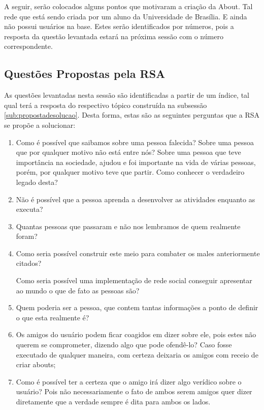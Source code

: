 A seguir, serão colocados alguns pontos que motivaram a criação da About. Tal rede que está sendo criada por um aluno
da Universidade de Brasília.
E ainda não possui usuários na base. Estes serão identificados por
números, pois a resposta da questão levantada estará na próxima sessão com o número correspondente.



\subsection{Questões Propostas pela RSA}
\label{sub:questoesrsa}
As questões levantadas nesta sessão são identificadas a partir de um índice,
tal qual terá a resposta do respectivo tópico
construída na subsessão \ref{sub:propostadesolucao}. Desta forma, estas
são as seguintes perguntas que a RSA se propõe a solucionar:

\begin{enumerate}
    \item Como é possível que saibamos sobre uma pessoa falecida? Sobre uma pessoa que por 
        qualquer motivo não está entre nós? Sobre uma pessoa que teve importância na 
        sociedade, ajudou e foi importante na vida de várias pessoas, porém, por 
        qualquer motivo teve que partir. Como conhecer o verdadeiro legado desta?
    \item Não é possível que a pessoa aprenda a desenvolver as atividades enquanto as executa?
    \item Quantas pessoas que passaram e não nos lembramos de quem realmente foram?
    \item Como seria possível construir este meio para combater os males anteriormente citados?

        Como seria possível uma implementação de rede social conseguir apresentar ao mundo o que
        de fato as pessoas são?
    \item Quem poderia ser a pessoa, que contem tantas informações a ponto de definir o que esta realmente é?

    \item Os amigos do usuário podem ficar coagidos em dizer sobre ele, pois estes não querem se comprometer,
        dizendo algo que pode ofendê-lo? Caso fosse executado de qualquer maneira, com certeza deixaria os amigos
        com receio de criar abouts;
    \item Como é possível ter a certeza que o amigo irá dizer algo verídico sobre o usuário? Pois não necessariamente o fato
        de ambos serem amigos quer dizer diretamente que a verdade sempre é dita para ambos os lados.
\end{enumerate}


